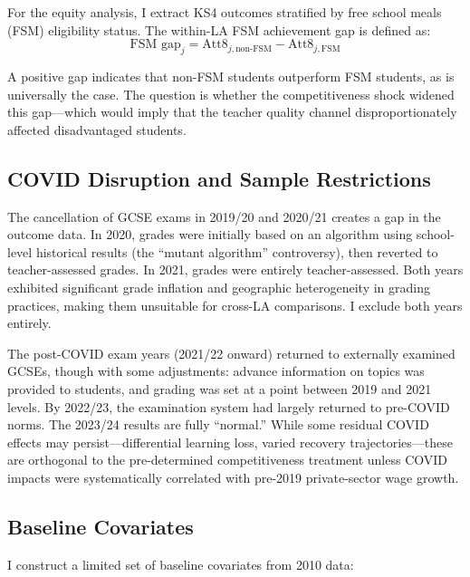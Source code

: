 \documentclass[12pt]{article}
\begin{document}
For the equity analysis, I extract KS4 outcomes stratified by free school meals (FSM) eligibility status. The within-LA FSM achievement gap is defined as:
\begin{equation}
\text{FSM gap}_j = \text{Att8}_{j,\text{non-FSM}} - \text{Att8}_{j,\text{FSM}}
\end{equation}

A positive gap indicates that non-FSM students outperform FSM students, as is universally the case. The question is whether the competitiveness shock widened this gap---which would imply that the teacher quality channel disproportionately affected disadvantaged students.

\subsection{COVID Disruption and Sample Restrictions}

The cancellation of GCSE exams in 2019/20 and 2020/21 creates a gap in the outcome data. In 2020, grades were initially based on an algorithm using school-level historical results (the ``mutant algorithm'' controversy), then reverted to teacher-assessed grades. In 2021, grades were entirely teacher-assessed. Both years exhibited significant grade inflation and geographic heterogeneity in grading practices, making them unsuitable for cross-LA comparisons. I exclude both years entirely.

The post-COVID exam years (2021/22 onward) returned to externally examined GCSEs, though with some adjustments: advance information on topics was provided to students, and grading was set at a point between 2019 and 2021 levels. By 2022/23, the examination system had largely returned to pre-COVID norms. The 2023/24 results are fully ``normal.'' While some residual COVID effects may persist---differential learning loss, varied recovery trajectories---these are orthogonal to the pre-determined competitiveness treatment unless COVID impacts were systematically correlated with pre-2019 private-sector wage growth.

\subsection{Baseline Covariates}

I construct a limited set of baseline covariates from 2010 data:
\end{document}
